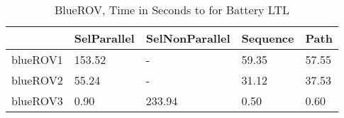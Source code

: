 \begin{table}
\centering
\caption{BlueROV, Time in Seconds to for Battery LTL}
\label{ROV_LTL_battery_time}
\begin{tabular}{lllll}
\toprule
{} & SelParallel & SelNonParallel & Sequence &   Path \\
\midrule
blueROV1 &      153.52 &              - &    59.35 &  57.55 \\
blueROV2 &       55.24 &              - &    31.12 &  37.53 \\
blueROV3 &        0.90 &         233.94 &     0.50 &   0.60 \\
\bottomrule
\end{tabular}
\end{table}
